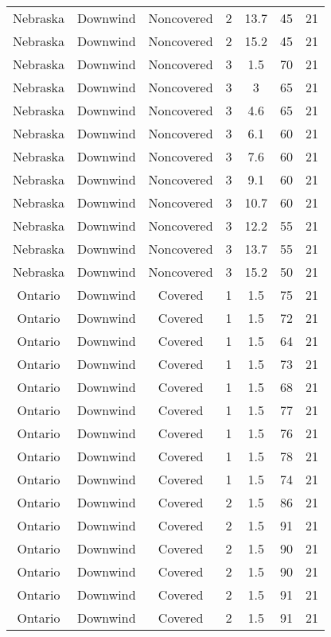 \documentclass{article}
\begin{document}
\begin{longtable}[H]{ccccccc}
Nebraska & Downwind & Noncovered & 2 & 13.7 & 45 & 21 \\
Nebraska & Downwind & Noncovered & 2 & 15.2 & 45 & 21 \\
Nebraska & Downwind & Noncovered & 3 & 1.5  & 70 & 21 \\
Nebraska & Downwind & Noncovered & 3 & 3    & 65 & 21 \\
Nebraska & Downwind & Noncovered & 3 & 4.6  & 65 & 21 \\
Nebraska & Downwind & Noncovered & 3 & 6.1  & 60 & 21 \\
Nebraska & Downwind & Noncovered & 3 & 7.6  & 60 & 21 \\
Nebraska & Downwind & Noncovered & 3 & 9.1  & 60 & 21 \\
Nebraska & Downwind & Noncovered & 3 & 10.7 & 60 & 21 \\
Nebraska & Downwind & Noncovered & 3 & 12.2 & 55 & 21 \\
Nebraska & Downwind & Noncovered & 3 & 13.7 & 55 & 21 \\
Nebraska & Downwind & Noncovered & 3 & 15.2 & 50 & 21 \\
Ontario & Downwind & Covered     & 1 & 1.5  & 75  & 21 \\
Ontario & Downwind & Covered     & 1 & 1.5  & 72  & 21 \\
Ontario & Downwind & Covered     & 1 & 1.5  & 64  & 21 \\
Ontario & Downwind & Covered     & 1 & 1.5  & 73  & 21 \\
Ontario & Downwind & Covered     & 1 & 1.5  & 68  & 21 \\
Ontario & Downwind & Covered     & 1 & 1.5  & 77  & 21 \\
Ontario & Downwind & Covered     & 1 & 1.5  & 76  & 21 \\
Ontario & Downwind & Covered     & 1 & 1.5  & 78  & 21 \\
Ontario & Downwind & Covered     & 1 & 1.5  & 74  & 21 \\
Ontario & Downwind & Covered     & 2 & 1.5  & 86  & 21 \\
Ontario & Downwind & Covered     & 2 & 1.5  & 91  & 21 \\
Ontario & Downwind & Covered     & 2 & 1.5  & 90  & 21 \\
Ontario & Downwind & Covered     & 2 & 1.5  & 90  & 21 \\
Ontario & Downwind & Covered     & 2 & 1.5  & 91  & 21 \\
Ontario & Downwind & Covered     & 2 & 1.5  & 91  & 21 \\

\end{longtable}
\end{document}
